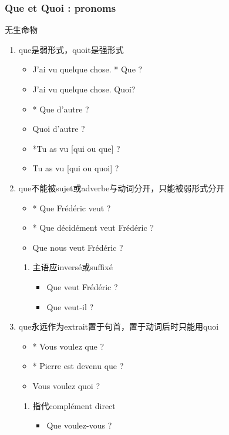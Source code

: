 \documentclass[UTF8]{report}
\begin{document}
\subsubsection{Que et Quoi : pronoms}
无生命物
\begin{enumerate}
    \item que是弱形式，quoit是强形式
    \begin{itemize}
        \item J’ai vu quelque chose. * Que ?
        \item J’ai vu quelque chose. Quoi?
        \item * Que d’autre ?
        \item Quoi d’autre ?
        \item *Tu as vu [qui ou que] ?
        \item Tu as vu [qui ou quoi] ?
    \end{itemize}
    \item que不能被sujet或adverbe与动词分开，只能被弱形式分开
    \begin{itemize}
        \item * Que Frédéric veut ?
        \item * Que décidément veut Frédéric ?
        \item Que nous veut Frédéric ?
    \end{itemize}
    \begin{enumerate}
        \item 主语应inversé或suffixé
        \begin{itemize}
            \item Que veut Frédéric ?
            \item Que veut-il ?
        \end{itemize}
    \end{enumerate}
    \item que永远作为extrait置于句首，置于动词后时只能用quoi
    \begin{itemize}
        \item * Vous voulez que ?
        \item * Pierre est devenu que ?
        \item Vous voulez quoi ?
    \end{itemize}
    \begin{enumerate}
        \item 指代complément direct
        \begin{itemize}
            \item Que voulez-vous ?
        \end{itemize}

\end{enumerate}
\end{enumerate}
\end{document}
